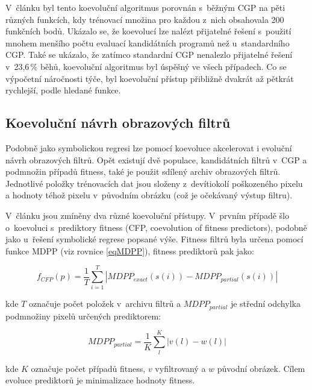 V~článku \cite{SikuEuroGP} byl tento koevoluční algoritmus porovnán s~běžným CGP na pěti různých funkcích, kdy trénovací množina pro každou z~nich obsahovala 200 funkčních bodů. Ukázalo se, že koevolucí lze nalézt přijatelné řešení s~použití mnohem menšího počtu evaluací kandidátních programů než u~standardního CGP. Také se ukázalo, že zatímco standardní CGP nenalezlo přijatelné řešení v~23,6\,\% běhů, koevoluční algoritmus byl úspěšný ve všech případech. Co se výpočetní náročnosti týče, byl koevoluční přístup přibližně dvakrát až pětkrát rychlejší, podle hledané funkce.


\subsection{Koevoluční návrh obrazových filtrů}
\label{secCoevIF}

Podobně jako symbolickou regresi lze pomocí koevoluce akcelerovat i evoluční návrh obrazových filtrů. Opět existují dvě populace, kandidátních filtrů v~CGP a podmnožin případů fitness, také je použit sdílený archiv obrazových filtrů. Jednotlivé položky trénovacích dat jsou složeny z~devítiokolí poškozeného pixelu a hodnoty téhož pixelu v~původním obrázku (což je očekávaný výstup filtru).

V~článku \cite{SikuPPSN} jsou zmíněny dva různé koevoluční přístupy. V~prvním případě šlo o~koevoluci s~prediktory fitness (CFP, coevolution of fitness predictors), podobně jako u~řešení symbolické regrese popsané výše. Fitness filtrů byla určena pomocí funkce MDPP (viz rovnice \ref{eqMDPP}), fitness prediktorů pak jako:

\begin{equation}
    \label{eqFpredictorIF}
    f_{\mathit{CFP}} \left( p \right) = \frac{1}{T} \sum\limits_{i=1}^{T} \left| \mathit{MDPP_{exact}} \left( s \left( i \right) \right) - \mathit{MDPP_{partial}} \left( s \left( i \right) \right) \right|
\end{equation}

\noindent{}kde $T$ označuje počet položek v~archivu filtrů a $\mathit{MDPP_{partial}}$ je střední odchylka podmnožiny pixelů určených prediktorem:

\begin{equation}
    \label{eqMDPPPartial}
    \mathit{MDPP_{partial}} = \frac{1}{K} \sum\limits_l^K \left| v\left( l \right) - w\left( l \right) \right|
\end{equation}

\noindent{}kde $K$ označuje počet případů fitness, $v$ vyfiltrovaný a $w$ původní obrázek. Cílem evoluce prediktorů je minimalizace hodnoty fitness.

